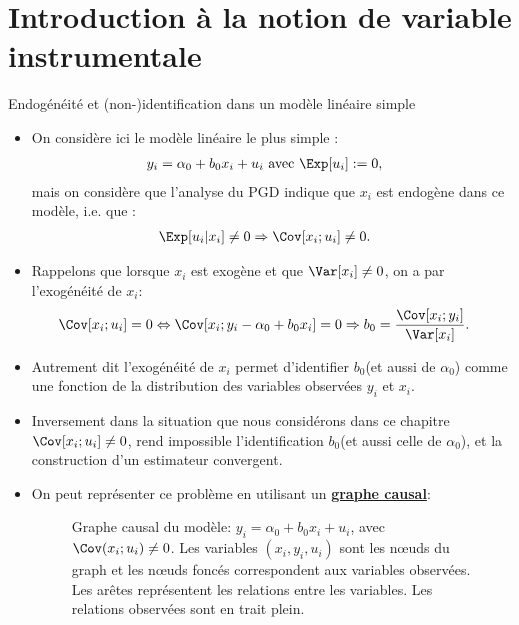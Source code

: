\section{Introduction à la notion de variable instrumentale}
\frame{\sectionpage}
\begin{frame}[allowframebreaks]{Endogénéité et (non-)identification dans un modèle linéaire simple}
\begin{itemize}
\item On considère ici le modèle linéaire le plus simple :
\begin{align}
    y_i &=\alpha_0 +b_0x_i + u_i \  \text{avec} \ \Exp[u_i]:= 0,
    \label{eq1}
\end{align}
mais on considère que l’analyse du PGD indique que $x_i$ est endogène dans ce 
modèle, i.e. que :
\begin{align*}
\Exp[u_i| x_i]\neq 0 &\Rightarrow \Cov[x_i; u_i]\neq 0.
\end{align*}
\item Rappelons que lorsque $x_i$ est exogène et que $\Var[x_i] \neq 0$, on a par l'exogénéité de 
$x_i$:
\begin{align*}
    \Cov[x_i; u_i] = 0 &\Leftrightarrow \Cov[x_i; y_i - \alpha_0 +b_0x_i] =0
     \Rightarrow b_0 = \frac{\Cov[x_i; y_i]}{\Var[x_i]}.
\end{align*}
\item Autrement dit l'exogénéité de $x_i$ permet d'identifier $b_0$(et aussi de $\alpha_0$)
comme une fonction de la distribution des variables observées $y_i$ et $x_i$.
\item Inversement dans la situation que nous considérons dans ce chapitre  $\Cov[x_i; u_i]\neq 0$, 
rend impossible l'identification $b_0$(et aussi celle de $\alpha_0$), et 
la construction d'un estimateur convergent.

\framebreak

\item On peut représenter ce problème en utilisant un
\href{https://en.wikipedia.org/wiki/Causal\_graph}{\textbf{graphe causal}}: 

\begin{figure}[hbt!]
    \centering
          \caption{Graphe causal du modèle: $y_i = \alpha_0 + b_0x_i + u_i$, 
          avec $\Cov(x_i ; u_i)\neq 0$. Les variables
          $(x_i, y_i, u_i)$ sont les nœuds du graph et les 
           nœuds foncés correspondent aux variables observées.
          Les arêtes représentent les relations entre les variables. 
          Les relations observées sont en trait plein.}
    \label{fig1}
          \end{figure}
        \end{itemize}
\end{frame}

